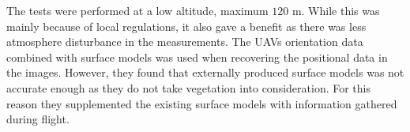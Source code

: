 The tests were performed at a low altitude, maximum $120$ m. While this was mainly because of local regulations, it also gave a benefit as there was less atmosphere disturbance in the measurements. The UAVs orientation data combined with surface models was used when recovering the positional data in the images. However, they found that externally produced surface models was not accurate enough as they do not take vegetation into consideration. For this reason they supplemented the existing surface models with information gathered during flight.